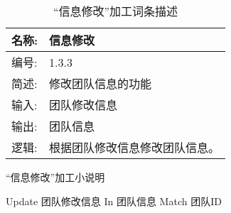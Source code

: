 \begin{table}[H]  
\caption{“信息修改”加工词条描述}  
\begin{center}  
    \begin{tabular}{l p{11cm}} 
        \hline
        \quad 名称:  &   信息修改 \\
        \hline
        \quad 编号:  & 1.3.3 \\
        \hline
        \quad 简述:  & 修改团队信息的功能 \\
        \hline
        \quad 输入:  & 团队修改信息\\
        \hline
        \quad 输出:  & 团队信息\\
        \hline
        \quad 逻辑:  & 根据团队修改信息修改团队信息。 \\
        \hline
    \end{tabular}
    \label{tab1}
\end{center}
\end{table}

\begin{algorithm}[H] 
    \renewcommand{\thealgorithm}{}
    \caption{“信息修改”加工小说明} 
    \label{alg3} 
    \begin{algorithmic}[1]
        \STATE Update 团队修改信息 In 团队信息 Match 团队ID
    \end{algorithmic} 
\end{algorithm}